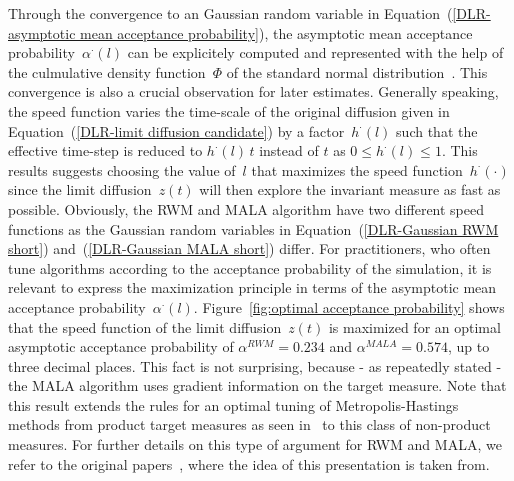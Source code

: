 Through the convergence to an Gaussian random variable in Equation~(\ref{DLR-asymptotic mean acceptance probability}), the asymptotic mean acceptance probability~$\alpha^{\cdot}(l)$ can be explicitely computed and represented with the help of the culmulative density function~$\Phi$ of the standard normal distribution~\autocite[Lemma B2]{Beskos2009-2}. This convergence is also a crucial observation for later estimates. Generally speaking, the speed function varies the time-scale of the original diffusion given in Equation~(\ref{DLR-limit diffusion candidate}) by a factor~$h^{\cdot}(l)$ such that the effective time-step is reduced to $h^{\cdot}(l)\,t$ instead of $t$ as $ 0 \leq h^{\cdot}(l) \leq 1$. This results suggests choosing the value of~$l$ that maximizes the speed function~$h^{\cdot}(\cdot)$ since the limit diffusion~$z(t)$ will then explore the invariant measure as fast as possible. Obviously, the RWM and MALA algorithm have two different speed functions as the Gaussian random variables in Equation~(\ref{DLR-Gaussian RWM short}) and~(\ref{DLR-Gaussian MALA short}) differ. For practitioners, who often tune algorithms according to the acceptance probability of the simulation, it is relevant to express the maximization principle in terms of the asymptotic mean acceptance probability~$\alpha^{\cdot}(l)$. Figure~\ref{fig:optimal acceptance probability} shows that the speed function of the limit diffusion~$z(t)$ is maximized for an optimal asymptotic acceptance probability of $\alpha^{RWM}=0.234$ and $\alpha^{MALA}=0.574$, up to three decimal places. This fact is not surprising, because - as repeatedly stated - the MALA  algorithm uses gradient information on the target measure. Note that this result extends the rules for an optimal tuning of Metropolis-Hastings methods from product target measures as seen in~\autocite{Bedard2007, Roberts1997, Roberts1998} to this class of non-product measures. For further details on this type of argument for RWM and MALA, we refer to the original papers~\autocite[Section 2.3, Section 2.6]{Mattingly2010, Pillai2012}, where the idea of this presentation is taken from.

